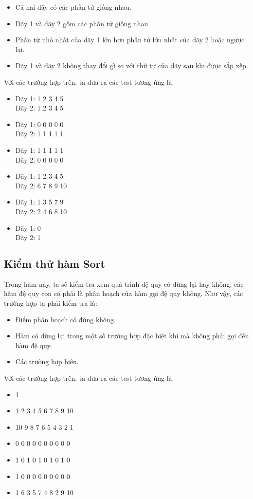 \documentclass{report}
\begin{document}
    \begin{itemize}
        \item Cả hai dãy có các phần tử giống nhau.
        \item Dãy 1 và dãy 2 gồm các phần tử giống nhau
        \item Phần tử nhỏ nhất của dãy 1 lớn hơn phần tử lớn nhất của dãy 2 hoặc ngược lại.
        \item Dãy 1 và dãy 2 không thay đổi gì so với thứ tự của dãy sau khi được sắp xếp.
    \end{itemize}
    Với các trường hợp trên, ta đưa ra các test tương ứng là:
    \begin{itemize}
        \item Dãy 1: 1 2 3 4 5 \\ Dãy 2: 1 2 3 4 5
        \item Dãy 1: 0 0 0 0 0  \\ Dãy 2: 1 1 1 1 1 
        \item Dãy 1: 1 1 1 1 1  \\ Dãy 2: 0 0 0 0 0 
        \item Dãy 1: 1 2 3 4 5  \\ Dãy 2: 6 7 8 9 10
        \item Dãy 1: 1 3 5 7 9  \\ Dãy 2: 2 4 6 8 10
        \item Dãy 1: 0  \\ Dãy 2: 1
    \end{itemize}

    \subsection{Kiểm thử hàm Sort}
    Trong hàm này, ta sẽ kiểm tra xem quá trình đệ quy có dừng lại hay không, 
    các hàm đệ quy con có phải là phân hoạch của hàm gọi đệ quy không.
    Như vậy, các trường hợp ta phải kiểm tra là:
    \begin{itemize}
        \item Điểm phân hoạch có đúng không.
        \item Hàm có dừng lại trong một số trường hợp đặc biệt khi mà không phải gọi đến hàm đệ quy.
        \item Các trường hợp biên.
    \end{itemize}
    Với các trường hợp trên, ta đưa ra các test tương ứng là:
    \begin{itemize}
        \item 1
        \item 1 2 3 4 5 6 7 8 9 10 
        \item 10 9 8 7 6 5 4 3 2 1 
        \item 0 0 0 0 0 0 0 0 0 0
        \item 1 0 1 0 1 0 1 0 1 0
        \item 1 0 0 0 0 0 0 0 0 0
        \item 1 6 3 5 7 4 8 2 9 10
    \end{itemize}
\end{document}
